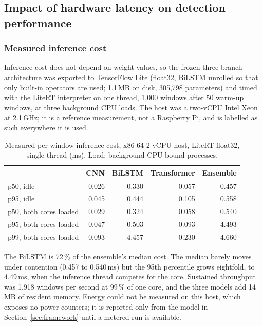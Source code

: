 \subsection{Impact of hardware latency on detection performance}\label{sec:hardware}
\subsubsection{Measured inference cost}
Inference cost does not depend on weight values, so the frozen three-branch architecture was exported to TensorFlow Lite (float32, BiLSTM unrolled so that only built-in operators are used; 1.1\,MB on disk, 305,798 parameters) and timed with the LiteRT interpreter on one thread, 1,000 windows after 50 warm-up windows, at three background CPU loads. The host was a two-vCPU Intel Xeon at 2.1\,GHz; it is a reference measurement, not a Raspberry Pi, and is labelled as such everywhere it is used.

\begin{table}[t]
\caption{Measured per-window inference cost, x86-64 2-vCPU host, LiteRT float32, single thread (ms). Load: background CPU-bound processes.}
\label{tab:latency}
\centering\footnotesize
\begin{tabular}{@{}lrrrr@{}}
\toprule
& \textbf{CNN} & \textbf{BiLSTM} & \textbf{Transformer} & \textbf{Ensemble} \\
\midrule
p50, idle & 0.026 & 0.330 & 0.057 & 0.457 \\
p95, idle & 0.045 & 0.444 & 0.105 & 0.558 \\
p50, both cores loaded & 0.029 & 0.324 & 0.058 & 0.540 \\
p95, both cores loaded & 0.047 & 0.503 & 0.093 & 4.493 \\
p99, both cores loaded & 0.093 & 4.457 & 0.230 & 4.660 \\
\bottomrule
\end{tabular}
\end{table}

\noindent The BiLSTM is 72\,\% of the ensemble's median cost. The median barely moves under contention (0.457 to 0.540\,ms) but the 95th percentile grows eightfold, to 4.49\,ms, when the inference thread competes for the core. Sustained throughput was 1,918 windows per second at 99\,\% of one core, and the three models add 14\,MB of resident memory. Energy could not be measured on this host, which exposes no power counters; it is reported only from the model in Section~\ref{sec:framework} until a metered run is available.

